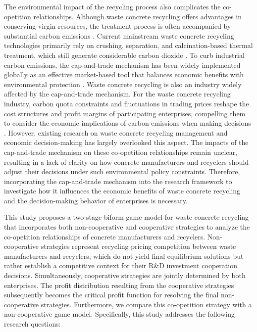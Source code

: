 \documentclass[authoryear,preprint,review,times,10pt]{elsarticle}
\begin{document}
The environmental impact of the recycling process also complicates the co-opetition relationships. Although waste concrete recycling offers advantages in conserving virgin resources, the treatment process is often accompanied by substantial carbon emissions \citep{difilippo2019Impacts}. Current mainstream waste concrete recycling technologies primarily rely on crushing, separation, and calcination-based thermal treatment, which still generate considerable carbon dioxide \citep{oh2021Proposal}. To curb industrial carbon emissions, the cap-and-trade mechanism has been widely implemented globally as an effective market-based tool that balances economic benefits with environmental protection \citep{oh2021Proposal,yenipazarli2019Incentives}. Waste concrete recycling is also an industry widely affected by the cap-and-trade mechanism.
For the waste concrete recycling industry, carbon quota constraints and fluctuations in trading prices reshape the cost structures and profit margins of participating enterprises, compelling them to consider the economic implications of carbon emissions when making decisions \citep{zheng2025Coopetition}. However, existing research on waste concrete recycling management and economic decision-making has largely overlooked this aspect. The impacts of the cap-and-trade mechanism on these co-opetition relationships remain unclear, resulting in a lack of clarity on how concrete manufacturers and recyclers should adjust their decisions under such environmental policy constraints. Therefore, incorporating the cap-and-trade mechanism into the research framework to investigate how it influences the economic benefits of waste concrete recycling and the decision-making behavior of enterprises is necessary.

This study proposes a two-stage biform game model for waste concrete recycling that incorporates both non-cooperative and cooperative strategies to analyze the co-opetition relationships of concrete manufacturers and recyclers. Non-cooperative strategies represent recycling pricing competition between waste manufacturers and recyclers, which do not yield final equilibrium solutions but rather establish a competitive context for their R\&D investment cooperation decisions. Simultaneously, cooperative strategies are jointly determined by both enterprises. The profit distribution resulting from the cooperative strategies subsequently becomes the critical profit function for resolving the final non-cooperative strategies. Furthermore, we compare this co-opetition strategy with a non-cooperative game model. Specifically, this study addresses the following research questions:
\end{document}

